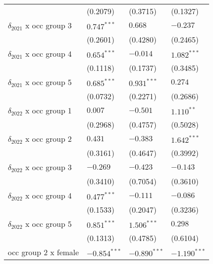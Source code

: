 \begin{tabular}{llll}
                                       &           (0.2079) &           (0.3715) &           (0.1327) \\
$\delta_{2021}$ x occ group 3          &      $0.747^{***}$ &            $0.668$ &           $-0.237$ \\
                                       &           (0.2601) &           (0.4280) &           (0.2465) \\
$\delta_{2021}$ x occ group 4          &      $0.654^{***}$ &           $-0.014$ &      $1.082^{***}$ \\
                                       &           (0.1118) &           (0.1737) &           (0.3485) \\
$\delta_{2021}$ x occ group 5          &      $0.685^{***}$ &      $0.931^{***}$ &            $0.274$ \\
                                       &           (0.0732) &           (0.2271) &           (0.2686) \\
$\delta_{2022}$ x occ group 1          &            $0.007$ &           $-0.501$ &       $1.110^{**}$ \\
                                       &           (0.2968) &           (0.4757) &           (0.5028) \\
$\delta_{2022}$ x occ group 2          &            $0.431$ &           $-0.383$ &      $1.642^{***}$ \\
                                       &           (0.3161) &           (0.4647) &           (0.3992) \\
$\delta_{2022}$ x occ group 3          &           $-0.269$ &           $-0.423$ &           $-0.143$ \\
                                       &           (0.3410) &           (0.7054) &           (0.3610) \\
$\delta_{2022}$ x occ group 4          &      $0.477^{***}$ &           $-0.111$ &           $-0.086$ \\
                                       &           (0.1533) &           (0.2047) &           (0.3236) \\
$\delta_{2022}$ x occ group 5          &      $0.851^{***}$ &      $1.506^{***}$ &            $0.298$ \\
                                       &           (0.1313) &           (0.4785) &           (0.6104) \\
occ group 2 x female                   &     $-0.854^{***}$ &     $-0.890^{***}$ &     $-1.190^{***}$ \\

\end{tabular}

